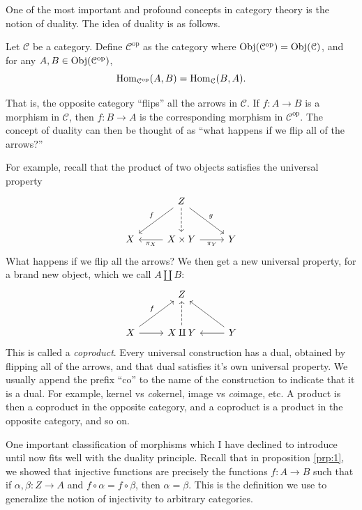 \documentclass[11pt, letterpaper]{article}
\begin{document}
One of the most important and profound concepts in category theory is the notion of duality. The idea of duality is as follows.

\begin{definition}\label{dfn:9}
	Let $\mathcal{C} $ be a category. Define $\mathcal{C} ^{\mathrm{op} } $ as the category where $\operatorname{Obj}(\mathcal{C} ^{\mathrm{op} } ) =\operatorname{Obj}(\mathcal{C} ) $, and for any $A,B\in \operatorname{Obj}(\mathcal{C} ^{\mathrm{op} } ) $,
	\[
		\operatorname{Hom}_{\mathcal{C} ^{\mathrm{op} } }(A, B) =\operatorname{Hom}_{\mathcal{C} }(B, A) 
	.\]
\end{definition}

That is, the opposite category ``flips'' all the arrows in $\mathcal{C} $. If $f : A \to B$ is a morphism in $\mathcal{C} $, then $f : B \to A$ is the corresponding morphism in $\mathcal{C} ^{\mathrm{op} } $. The concept of duality can then be thought of as ``what happens if we flip all of the arrows?''

For example, recall that the product of two objects satisfies the universal property
\[\begin{tikzcd}[row sep = 2.5em, column sep = 2.5em]
	&Z\ar[dr, "g"]\ar[dl, "f"']\ar[d, dashed]\\
	X&X\times Y\ar[l, "\pi _X"]\ar[r, "\pi _Y"']&Y
\end{tikzcd}\]
What happens if we flip all the arrows? We then get a new universal property, for a brand new object, which we call $A\amalg B$:
\[\begin{tikzcd}[row sep = 2.5em, column sep = 2.5em]
	&Z\\
	X\ar[ur, "f"]\ar[r]&X\amalg Y\ar[u, dashed]&Y\ar[l]\ar[ul]
\end{tikzcd}\]
This is called a \emph{coproduct}. Every universal construction has a dual, obtained by flipping all of the arrows, and that dual satisfies it's own universal property. We usually append the prefix ``co'' to the name of the construction to indicate that it is a dual. For example, kernel vs \emph{co}kernel, image vs \emph{co}image, etc. A product is then a coproduct in the opposite category, and a coproduct is a product in the opposite category, and so on.

One important classification of morphisms which I have declined to introduce until now fits well with the duality principle. Recall that in proposition \ref{prp:1}, we showed that injective functions are precisely the functions $f : A \to B$ such that if $\alpha ,\beta : Z \to A$ and $f\circ \alpha =f\circ \beta $, then $\alpha =\beta $. This is the definition we use to generalize the notion of injectivity to arbitrary categories.
\end{document}
